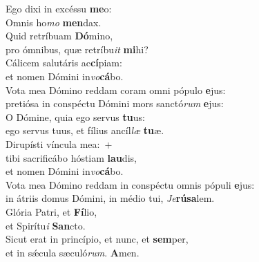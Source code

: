 \evenverse Ego dixi in excéssu \textbf{me}o:~\*\\
\evenverse Omnis ho\textit{mo} \textbf{men}dax.\\
\oddverse Quid retríbuam \textbf{Dó}mino,~\*\\
\oddverse pro ómnibus, quæ retríbu\textit{it} \textbf{mi}hi?\\
\evenverse Cálicem salutáris ac\textbf{cí}piam:~\*\\
\evenverse et nomen Dómini in\textit{vo}\textbf{cá}bo.\\
\oddverse Vota mea Dómino reddam coram omni pópulo \textbf{e}jus:~\*\\
\oddverse pretiósa in conspéctu Dómini mors sanctó\textit{rum} \textbf{e}jus:\\
\evenverse O Dómine, quia ego servus \textbf{tu}us:~\*\\
\evenverse ego servus tuus, et fílius ancíl\textit{læ} \textbf{tu}æ.\\
\oddverse Dirupísti víncula mea:~+\\
\oddverse  tibi sacrificábo hóstiam \textbf{lau}dis,~\*\\
\oddverse et nomen Dómini in\textit{vo}\textbf{cá}bo.\\
\evenverse Vota mea Dómino reddam in conspéctu omnis pópuli \textbf{e}jus:~\*\\
\evenverse in átriis domus Dómini, in médio tui, \textit{Je}\textbf{rú}\textbf{sa}lem.\\
\oddverse Glória Patri, et \textbf{Fí}lio,~\*\\
\oddverse et Spirítu\textit{i} \textbf{San}cto.\\
\evenverse Sicut erat in princípio, et nunc, et \textbf{sem}per,~\*\\
\evenverse et in sǽcula sæculó\textit{rum}. \textbf{A}men.\\
